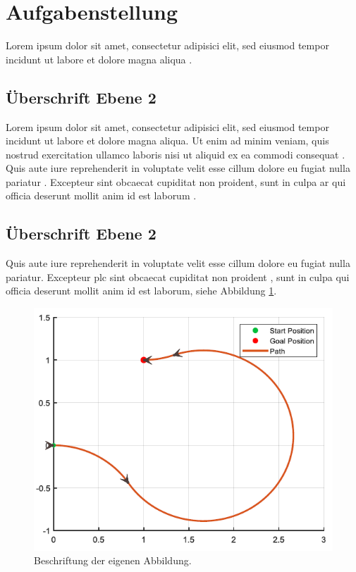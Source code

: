\section{Aufgabenstellung}

Lorem ipsum dolor sit amet, consectetur adipisici elit, sed eiusmod tempor incidunt ut labore
et dolore magna aliqua \cite{publikation:publikationtitel1}.

\lipsum[2]

\subsection{Überschrift Ebene 2}

Lorem ipsum dolor sit amet, consectetur adipisici elit, sed eiusmod tempor incidunt ut labore
et dolore magna aliqua. Ut enim ad minim veniam, quis nostrud exercitation ullamco laboris
nisi ut aliquid ex ea commodi consequat \cite{publikation:publikationtitel2}. Quis aute iure reprehenderit in voluptate velit
esse cillum dolore eu fugiat nulla pariatur \cite{publikation:publikationtitel1}. Excepteur sint obcaecat cupiditat non
proident, sunt in culpa \ac{ar} qui officia deserunt mollit anim id est laborum \cite{buch:buchtitel1}.

\subsection{Überschrift Ebene 2}

Quis aute iure reprehenderit in voluptate velit esse cillum dolore eu fugiat nulla pariatur.
Excepteur \ac{plc} sint obcaecat cupiditat non proident \cite{zeitschrift:zeitschrifttitel1}, sunt in culpa qui officia deserunt mollit
anim id est laborum, siehe Abbildung \ref{fig:Bild1}.

\begin{figure}[H]
    \centering
    \includegraphics[scale=0.7]{20_Hauptteil/20_Dateien/Bild1.png}
    \caption{Beschriftung der eigenen Abbildung.}
    \label{fig:Bild1}
\end{figure}


